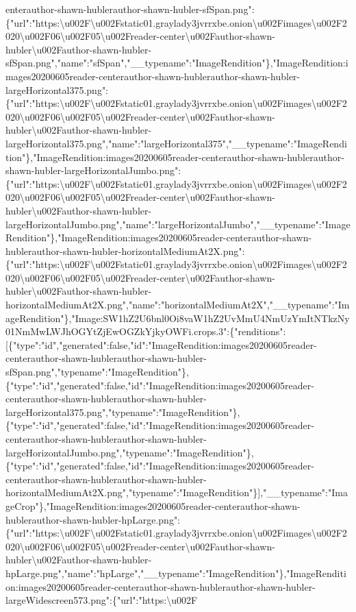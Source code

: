 enterauthor-shawn-hublerauthor-shawn-hubler-sfSpan.png":\{"url":"https:\textbackslash{}u002F\textbackslash{}u002Fstatic01.graylady3jvrrxbe.onion\textbackslash{}u002Fimages\textbackslash{}u002F2020\textbackslash{}u002F06\textbackslash{}u002F05\textbackslash{}u002Freader-center\textbackslash{}u002Fauthor-shawn-hubler\textbackslash{}u002Fauthor-shawn-hubler-sfSpan.png","name":"sfSpan","\_\_typename":"ImageRendition"\},"ImageRendition:images20200605reader-centerauthor-shawn-hublerauthor-shawn-hubler-largeHorizontal375.png":\{"url":"https:\textbackslash{}u002F\textbackslash{}u002Fstatic01.graylady3jvrrxbe.onion\textbackslash{}u002Fimages\textbackslash{}u002F2020\textbackslash{}u002F06\textbackslash{}u002F05\textbackslash{}u002Freader-center\textbackslash{}u002Fauthor-shawn-hubler\textbackslash{}u002Fauthor-shawn-hubler-largeHorizontal375.png","name":"largeHorizontal375","\_\_typename":"ImageRendition"\},"ImageRendition:images20200605reader-centerauthor-shawn-hublerauthor-shawn-hubler-largeHorizontalJumbo.png":\{"url":"https:\textbackslash{}u002F\textbackslash{}u002Fstatic01.graylady3jvrrxbe.onion\textbackslash{}u002Fimages\textbackslash{}u002F2020\textbackslash{}u002F06\textbackslash{}u002F05\textbackslash{}u002Freader-center\textbackslash{}u002Fauthor-shawn-hubler\textbackslash{}u002Fauthor-shawn-hubler-largeHorizontalJumbo.png","name":"largeHorizontalJumbo","\_\_typename":"ImageRendition"\},"ImageRendition:images20200605reader-centerauthor-shawn-hublerauthor-shawn-hubler-horizontalMediumAt2X.png":\{"url":"https:\textbackslash{}u002F\textbackslash{}u002Fstatic01.graylady3jvrrxbe.onion\textbackslash{}u002Fimages\textbackslash{}u002F2020\textbackslash{}u002F06\textbackslash{}u002F05\textbackslash{}u002Freader-center\textbackslash{}u002Fauthor-shawn-hubler\textbackslash{}u002Fauthor-shawn-hubler-horizontalMediumAt2X.png","name":"horizontalMediumAt2X","\_\_typename":"ImageRendition"\},"Image:SW1hZ2U6bnl0Oi8vaW1hZ2UvMmU4NmUzYmItNTkzNy01NmMwLWJhOGYtZjEwOGZkYjkyOWFi.crops.3":\{"renditions":{[}\{"type":"id","generated":false,"id":"ImageRendition:images20200605reader-centerauthor-shawn-hublerauthor-shawn-hubler-sfSpan.png","typename":"ImageRendition"\},\{"type":"id","generated":false,"id":"ImageRendition:images20200605reader-centerauthor-shawn-hublerauthor-shawn-hubler-largeHorizontal375.png","typename":"ImageRendition"\},\{"type":"id","generated":false,"id":"ImageRendition:images20200605reader-centerauthor-shawn-hublerauthor-shawn-hubler-largeHorizontalJumbo.png","typename":"ImageRendition"\},\{"type":"id","generated":false,"id":"ImageRendition:images20200605reader-centerauthor-shawn-hublerauthor-shawn-hubler-horizontalMediumAt2X.png","typename":"ImageRendition"\}{]},"\_\_typename":"ImageCrop"\},"ImageRendition:images20200605reader-centerauthor-shawn-hublerauthor-shawn-hubler-hpLarge.png":\{"url":"https:\textbackslash{}u002F\textbackslash{}u002Fstatic01.graylady3jvrrxbe.onion\textbackslash{}u002Fimages\textbackslash{}u002F2020\textbackslash{}u002F06\textbackslash{}u002F05\textbackslash{}u002Freader-center\textbackslash{}u002Fauthor-shawn-hubler\textbackslash{}u002Fauthor-shawn-hubler-hpLarge.png","name":"hpLarge","\_\_typename":"ImageRendition"\},"ImageRendition:images20200605reader-centerauthor-shawn-hublerauthor-shawn-hubler-largeWidescreen573.png":\{"url":"https:\textbackslash{}u002F\